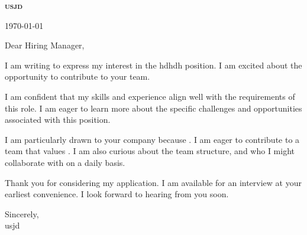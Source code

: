 \documentclass[letterpaper,11pt]{article}
\begin{document}
\begin{center}
\textbf{\Huge \scshape usjd} \\ \vspace{1pt}
\end{center}

\today

Dear Hiring Manager, \\
\vspace{10pt}

I am writing to express my interest in the hdhdh position. I am excited about the opportunity to contribute to your team.
\vspace{10pt}

I am confident that my skills and experience align well with the requirements of this role. I am eager to learn more about the specific challenges and opportunities associated with this position.
\vspace{10pt}

I am particularly drawn to your company because . I am eager to contribute to a team that values . I am also curious about the team structure, and who I might collaborate with on a daily basis.
\vspace{10pt}

Thank you for considering my application. I am available for an interview at your earliest convenience. I look forward to hearing from you soon.
\vspace{20pt}

Sincerely,\\
\vspace{40pt} %
usjd
\end{document}
